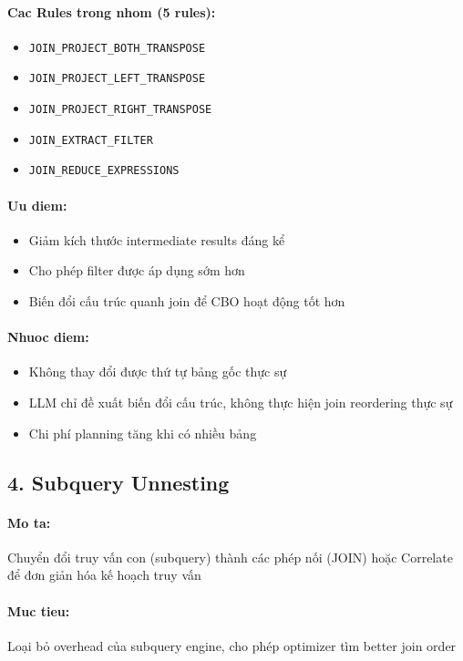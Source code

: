 \paragraph{Cac Rules trong nhom (5 rules):}
\begin{itemize}
\item \texttt{JOIN_PROJECT_BOTH_TRANSPOSE}
\item \texttt{JOIN_PROJECT_LEFT_TRANSPOSE}
\item \texttt{JOIN_PROJECT_RIGHT_TRANSPOSE}
\item \texttt{JOIN_EXTRACT_FILTER}
\item \texttt{JOIN_REDUCE_EXPRESSIONS}
\end{itemize}
\paragraph{Uu diem:}
\begin{itemize}
\item Giảm kích thước intermediate results đáng kể
\item Cho phép filter được áp dụng sớm hơn
\item Biến đổi cấu trúc quanh join để CBO hoạt động tốt hơn
\end{itemize}
\paragraph{Nhuoc diem:}
\begin{itemize}
\item Không thay đổi được thứ tự bảng gốc thực sự
\item LLM chỉ đề xuất biến đổi cấu trúc, không thực hiện join reordering thực sự
\item Chi phí planning tăng khi có nhiều bảng
\end{itemize}
\newpage

\subsection*{\bfseries 4. Subquery Unnesting}
\paragraph{Mo ta:} Chuyển đổi truy vấn con (subquery) thành các phép nối (JOIN) hoặc Correlate để đơn giản hóa kế hoạch truy vấn
\paragraph{Muc tieu:} Loại bỏ overhead của subquery engine, cho phép optimizer tìm better join order
